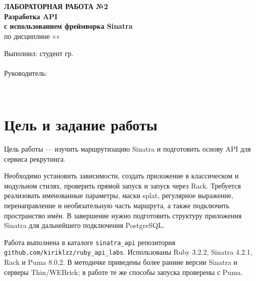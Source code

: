 \documentclass[12pt,a4paper]{article}
\begin{document}
\begin{titlepage}
  \thispagestyle{empty}
  \begin{center}
    \University\\
    \Institute\\
    \School
  \end{center}
  \vspace{30mm}
  \begin{center}
    \textbf{ЛАБОРАТОРНАЯ РАБОТА №2}\\[5mm]
    \textbf{Разработка API}\\
    \textbf{с использованием фреймворка Sinatra}\\[4mm]
    по дисциплине «\Discipline»
  \end{center}
  \vspace{47mm}
  \begin{flushright}
    \begin{minipage}{0.58\textwidth}
      Выполнил: студент гр. \StudentGroup\\
      \StudentName\\[5mm]
      Руководитель: \SupervisorRole\\
      \SupervisorName
    \end{minipage}
  \end{flushright}
  \vfill
  \begin{center}
    \ReportCity\\
    \ReportYear
  \end{center}
\end{titlepage}
\setcounter{page}{2}


\section{Цель и задание работы}

Цель работы --- изучить маршрутизацию Sinatra и подготовить основу API для сервиса рекрутинга.

Необходимо установить зависимости, создать приложение в классическом и модульном стилях, проверить прямой запуск и запуск через Rack. Требуется реализовать именованные параметры, маски splat, регулярное выражение, перенаправление и необязательную часть маршрута, а также подключить пространство имён. В завершение нужно подготовить структуру приложения Sinatra для дальнейшего подключения PostgreSQL.

Работа выполнена в каталоге \texttt{sinatra\_api} репозитория \texttt{github.com/kiriklzz/}\allowbreak\texttt{ruby\_api\_labs}. Использованы Ruby 3.2.2, Sinatra 4.2.1, Rack и Puma 8.0.2. В методичке приведены более ранние версии Sinatra и серверы Thin/WEBrick; в работе те же способы запуска проверены с Puma.
\end{document}
